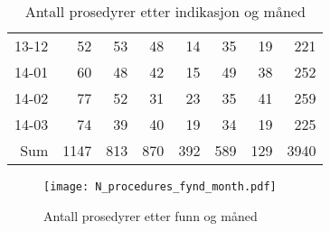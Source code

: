\documentclass[presentation,xcolor=pdftex,dvipsnames,table]{beamer}
\begin{document}
\begin{frame}
\begin{tiny}
\begin{table}[ht]
\begin{tabular}{rrrrrrrr}
  13-12 & 52 & 53 & 48 & 14 & 35 & 19 & 221 \\ 
  14-01 & 60 & 48 & 42 & 15 & 49 & 38 & 252 \\ 
  14-02 & 77 & 52 & 31 & 23 & 35 & 41 & 259 \\ 
  14-03 & 74 & 39 & 40 & 19 & 34 & 19 & 225 \\ 
  Sum & 1147 & 813 & 870 & 392 & 589 & 129 & 3940 \\ 
   \bottomrule
\end{tabular}
\caption{Antall prosedyrer etter indikasjon og måned} 
\end{table}\end{tiny}
\end{frame}




\begin{frame}
\begin{figure}
  \centering
  \caption{Antall prosedyrer etter funn og måned}
\texttt{[image: N\_procedures\_fynd\_month.pdf]}
\end{figure}\end{frame}
\end{document}
